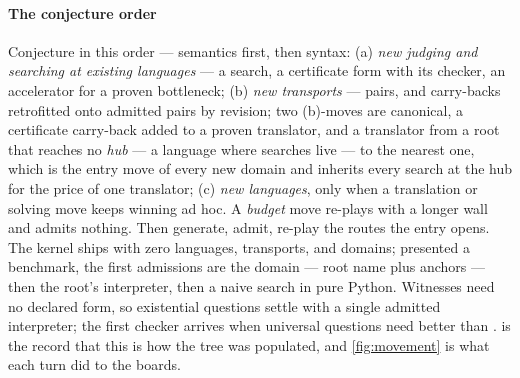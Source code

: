 \paragraph{The conjecture order}
Conjecture in this order --- semantics first, then syntax: (a)
\emph{new judging and searching at existing languages} --- a search,
a certificate form with its checker, an accelerator for a proven
bottleneck; (b) \emph{new transports} --- pairs, and carry-backs
retrofitted onto admitted pairs by revision; two (b)-moves are
canonical, a certificate carry-back added to a proven translator, and
a translator from a root that reaches no \emph{hub} --- a language
where searches live --- to the nearest one,
which is the entry move of every new domain and inherits every search
at the hub for the price of one translator; (c) \emph{new languages},
only when a translation or solving move keeps winning ad hoc. A
\emph{budget} move re-plays with a longer wall and admits nothing.
Then generate, admit, re-play the routes the entry opens. The kernel ships with zero
languages, transports, and domains; presented a benchmark, the first
admissions are the domain --- root name plus anchors --- then the
root's interpreter, then a naive search in pure Python. Witnesses
need no declared form, so existential questions settle
 with a single admitted interpreter; the first
checker arrives when universal questions need better than
.  is the record that this is how the
tree was populated, and \cref{fig:movement} is what each turn did to
the boards.


